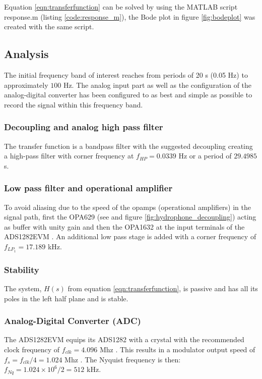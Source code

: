 \documentclass[a4paper]{article}
\begin{document}
Equation \ref{eqn:transferfunction} can be solved by using the MATLAB
script response.m (listing \ref{code:response_m}), the Bode plot in figure \ref{fig:bodeplot} was created with the same script.

\subsection{Analysis}
The initial frequency band of interest reaches
from periods of 20 s (0.05 Hz) to approximately $100$ Hz. The analog input part as
well as the configuration of the analog-digital converter has been
configured to as best and simple as possible to record the signal
within this frequency band.

\subsubsection{Decoupling and analog high pass filter}
The transfer function is a bandpass filter with
the suggested decoupling creating a high-pass filter with corner
frequency at $f_{HP} = 0.0339$ Hz or a period of $29.4985$ s.

\subsubsection{Low pass filter and operational amplifier}

To avoid aliasing due to the speed of the opamps (operational
amplifiers) in the signal path, first the OPA629 (see \cite{opa629_ds} and
figure \ref{fig:hydrophone_decoupling}) acting as buffer with
unity gain and then the OPA1632 \cite{opa1632_ds} at the input terminals
of the ADS1282EVM \cite{ads1282evm_ds}.
An additional low pass stage is added with a corner frequency of
$f_{LP_1} = 17.189 $ kHz.

\subsubsection{Stability}
The system, $H(s)$ from equation \eqref{eqn:transferfunction}, is
passive and has all
its poles in the left half plane and is stable.

\subsubsection{Analog-Digital Converter (ADC)}
The ADS1282EVM equips its ADS1282 with a crystal with the recommended clock frequency of
$f_{clk} = 4.096$ Mhz \cite{ads1282evm_ds}. This results in a modulator
output speed of $ f_s = f_{clk}/4 = 1.024$ Mhz \cite{ads1282_ds}. The
Nyquist frequency is then: $f_{Nq} = 1.024 \times 10^6 / 2 = 512 $ kHz.
\end{document}
